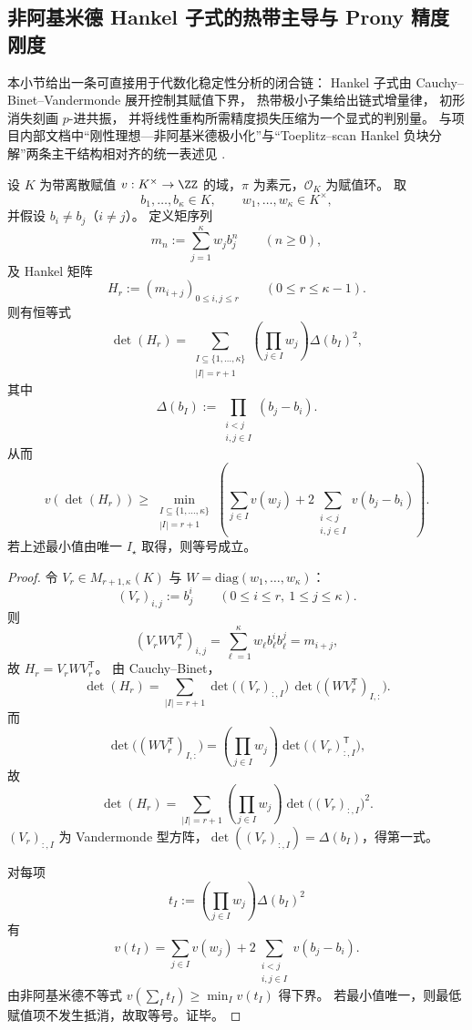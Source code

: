 \subsection{非阿基米德 Hankel 子式的热带主导与 Prony 精度刚度}\label{subsec:conclusion-nonarchimedean-hankel-tropical-prony-rigidity}
本小节给出一条可直接用于代数化稳定性分析的闭合链：
Hankel 子式由 Cauchy--Binet--Vandermonde 展开控制其赋值下界，
热带极小子集给出链式增量律，
初形消失刻画 \(p\)-进共振，
并将线性重构所需精度损失压缩为一个显式的判别量。
与项目内部文档中“刚性理想—非阿基米德极小化”与“Toeplitz--scan Hankel 负块分解”两条主干结构相对齐的统一表述见 \cite{Internal2026HankelRigidityNonarchMinToeplitzScan}.

\begin{theorem}\label{thm:conclusion-nonarch-hankel-cauchy-binet-vandermonde}
设 \(K\) 为带离散赋值 \(v:K^\times\to\ZZ\) 的域，\(\pi\) 为素元，\(\mathcal O_K\) 为赋值环。
取
\[
b_1,\dots,b_\kappa\in K,\qquad
w_1,\dots,w_\kappa\in K^\times,
\]
并假设 \(b_i\neq b_j\)（\(i\neq j\)）。
定义矩序列
\[
m_n:=\sum_{j=1}^{\kappa}w_j b_j^n\qquad(n\ge 0),
\]
及 Hankel 矩阵
\[
H_r:=(m_{i+j})_{0\le i,j\le r}\qquad(0\le r\le \kappa-1).
\]
则有恒等式
\[
\det(H_r)
=
\sum_{\substack{I\subseteq\{1,\dots,\kappa\}\\ |I|=r+1}}
\left(\prod_{j\in I}w_j\right)\Delta(b_I)^2,
\]
其中
\[
\Delta(b_I):=\prod_{\substack{i<j\\ i,j\in I}}(b_j-b_i).
\]
从而
\[
v(\det(H_r))
\ge
\min_{\substack{I\subseteq\{1,\dots,\kappa\}\\ |I|=r+1}}
\left(
\sum_{j\in I}v(w_j)
+
2\!\!\sum_{\substack{i<j\\ i,j\in I}}v(b_j-b_i)
\right).
\]
若上述最小值由唯一 \(I_\star\) 取得，则等号成立。
\end{theorem}
\begin{proof}
令 \(V_r\in M_{r+1,\kappa}(K)\) 与 \(W=\mathrm{diag}(w_1,\dots,w_\kappa)\)：
\[
(V_r)_{i,j}:=b_j^i\qquad(0\le i\le r,\ 1\le j\le \kappa).
\]
则
\[
(V_r W V_r^{\mathsf T})_{i,j}
=
\sum_{\ell=1}^{\kappa}w_\ell b_\ell^i b_\ell^j
=m_{i+j},
\]
故 \(H_r=V_r W V_r^{\mathsf T}\)。
由 Cauchy--Binet，
\[
\det(H_r)
=
\sum_{|I|=r+1}
\det\!\bigl((V_r)_{:,I}\bigr)\,
\det\!\bigl((W V_r^{\mathsf T})_{I,:}\bigr).
\]
而
\[
\det\!\bigl((W V_r^{\mathsf T})_{I,:}\bigr)
=
\left(\prod_{j\in I}w_j\right)\det\!\bigl((V_r)_{:,I}^{\mathsf T}\bigr),
\]
故
\[
\det(H_r)
=
\sum_{|I|=r+1}
\left(\prod_{j\in I}w_j\right)\det\!\bigl((V_r)_{:,I}\bigr)^2.
\]
\((V_r)_{:,I}\) 为 Vandermonde 型方阵，\(\det((V_r)_{:,I})=\Delta(b_I)\)，得第一式。

对每项
\[
t_I:=\left(\prod_{j\in I}w_j\right)\Delta(b_I)^2
\]
有
\[
v(t_I)=\sum_{j\in I}v(w_j)+2\!\!\sum_{\substack{i<j\\ i,j\in I}}v(b_j-b_i).
\]
由非阿基米德不等式 \(v(\sum_I t_I)\ge \min_I v(t_I)\) 得下界。
若最小值唯一，则最低赋值项不发生抵消，故取等号。证毕。
\end{proof}

